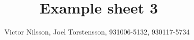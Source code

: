 \documentclass[12pt,A4]{article}
\begin{document}
\parindent=0cm

\title{Example sheet 3}
\author{{\small Victor Nilsson, Joel Torstensson, \hfill 931006-5132, 930117-5734 \,}}
\maketitle

\section{}

\newpage
\section{}

\end{document}

